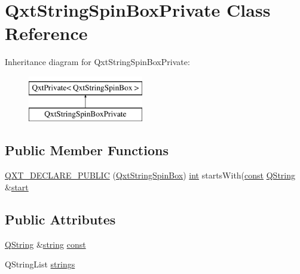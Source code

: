 \hypertarget{class_qxt_string_spin_box_private}{\section{Qxt\-String\-Spin\-Box\-Private Class Reference}
\label{class_qxt_string_spin_box_private}
}
Inheritance diagram for Qxt\-String\-Spin\-Box\-Private\-:\begin{figure}[H]
\begin{center}
\leavevmode
\includegraphics[height=2.000000cm]{class_qxt_string_spin_box_private}
\end{center}
\end{figure}
\subsection*{Public Member Functions}
\begin{DoxyCompactItemize}
\item 
\hyperlink{class_qxt_string_spin_box_private_aad0c08197b54224a1f1e64aa6cb70b7c}{Q\-X\-T\-\_\-\-D\-E\-C\-L\-A\-R\-E\-\_\-\-P\-U\-B\-L\-I\-C} (\hyperlink{class_qxt_string_spin_box}{Qxt\-String\-Spin\-Box}) \hyperlink{ioapi_8h_a787fa3cf048117ba7123753c1e74fcd6}{int} starts\-With(\hyperlink{class_qxt_string_spin_box_private_a2da5798e2a499e3246ef11c4bb7e5e0c}{const} \hyperlink{group___u_a_v_objects_plugin_gab9d252f49c333c94a72f97ce3105a32d}{Q\-String} \&\hyperlink{glext_8h_a13be19455586e95d5a42ed8f054afad2}{start}
\end{DoxyCompactItemize}
\subsection*{Public Attributes}
\begin{DoxyCompactItemize}
\item 
\hyperlink{group___u_a_v_objects_plugin_gab9d252f49c333c94a72f97ce3105a32d}{Q\-String} \&\hyperlink{glext_8h_aa81bcd27b2208041814b4beacb88c2d9}{string} \hyperlink{class_qxt_string_spin_box_private_a2da5798e2a499e3246ef11c4bb7e5e0c}{const}
\item 
Q\-String\-List \hyperlink{class_qxt_string_spin_box_private_ab29c74306012d3c6e9789209c82c1d97}{strings}
\end{DoxyCompactItemize}
